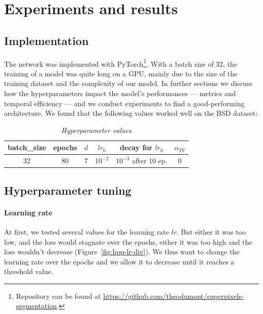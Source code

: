 \documentclass{article}
\begin{document}
\section{Experiments and results}

    \subsection{Implementation}
        The network was implemented with PyTorch\footnote{Repository can be found at \url{https://github.com/theodumont/superpixels-segmentation}.}. With a batch size of 32, the training of a model was quite long on a GPU, mainly due to the size of the training dataset and the complexity of our model. In further sections we discuss how the hyperparameters impact the model's performances --- metrics and temporal efficiency --- and we conduct experiments to find a good-performing architecture. We found that the following values worked well on the BSD dataset:
        \begin{table}[!ht]
            \centering
            \begin{tabular}{|c|c|c|c|c|c|}
                \hline
                batch\_size & epochs & $d$ & $lr_0$ & decay for $lr_0$ & $\alpha_{TV}$ \\
                \hline
                \hline
                32 & 80 & $7$ & $10^{-2}$ & $10^{-3}$ after 10 ep. & 0 \\
                \hline
            \end{tabular}
            \caption{\textit{Hyperparameter values}}
        \end{table}


    \subsection{Hyperparameter tuning}
        \paragraph{Learning rate}
        At first, we tested several values for the learning rate $lr$. But either it was too low, and the loss would stagnate over the epochs, either it was too high and the loss wouldn't decrease (Figure~\ref{fig:hpp-lr-div}). We thus want to change the learning rate over the epochs and we allow it to decrease until it reaches a threshold value.
\end{document}
